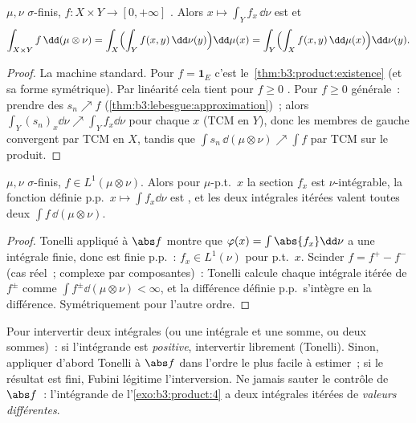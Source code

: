 \begin{theorem}[Tonelli]\label{thm:b3:product:tonelli}
$\mu, \nu$ $\sigma$-finis, $f \colon X\times Y \to [0,
+\infty]$ . Alors $x \mapsto \int_Y f_x\,\dd\nu$ est
 et
\[
\int_{X\times Y}f\,\dd(\mu\otimes\nu)
= \int_X\Bigl(\int_Y f(x,y)\,\dd\nu(y)\Bigr)\dd\mu(x)
= \int_Y\Bigl(\int_X f(x,y)\,\dd\mu(x)\Bigr)\dd\nu(y).
\]
\end{theorem}

\begin{proof}
La machine standard. Pour $f = \mathbf 1_E$ c'est
le~\cref{thm:b3:product:existence} (et sa forme symétrique).
Par linéarité cela tient pour $f \geq 0$ . Pour $f \geq
0$ générale~: prendre des  $s_n \nearrow f$
(\cref{thm:b3:lebesgue:approximation})~; alors
$\int_Y(s_n)_x \dd\nu \nearrow \int_Y f_x\dd\nu$ pour chaque
$x$ (TCM en $Y$), donc les membres de gauche convergent par
TCM en $X$, tandis que $\int s_n\,\dd(\mu\otimes\nu)
\nearrow \int f$ par TCM sur le produit.
\end{proof}

\begin{theorem}[Fubini]\label{thm:b3:product:fubini}
$\mu, \nu$ $\sigma$-finis, $f \in L^1(\mu\otimes\nu)$. Alors
pour $\mu$-p.t.\ $x$ la section $f_x$ est $\nu$-intégrable, la
fonction définie p.p.\ $x \mapsto \int f_x\dd\nu$ est
, et les deux intégrales itérées valent toutes deux
$\int f\,\dd(\mu\otimes\nu)$.
\end{theorem}

\begin{proof}
Tonelli appliqué à $\abs f$ montre que $\varphi(x) =
\int\abs{f_x} \dd\nu$ a une intégrale finie, donc est finie
p.p.~: $f_x \in L^1(\nu)$ pour p.t.\ $x$. Scinder $f = f^+ -
f^-$ (cas réel~; complexe par composantes)~: Tonelli calcule
chaque intégrale itérée de $f^\pm$ comme $\int
f^\pm\dd(\mu\otimes\nu) < \infty$, et la différence définie
p.p.\ s'intègre en la différence. Symétriquement pour l'autre
ordre.
\end{proof}

\begin{method}\label{met:b3:product:fubini}
Pour intervertir deux intégrales (ou une intégrale et une
somme, ou deux sommes)~: si l'intégrande est
\emph{positive}, intervertir librement (Tonelli). Sinon,
appliquer d'abord Tonelli à $\abs f$ dans l'ordre le plus
facile à estimer~; si le résultat est fini, Fubini légitime
l'interversion. Ne jamais sauter le contrôle de $\abs f$~:
l'intégrande de l'\cref{exo:b3:product:4} a deux intégrales
itérées de \emph{valeurs différentes}.
\end{method}

